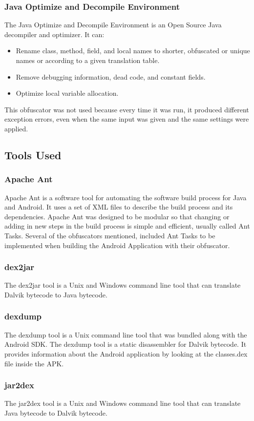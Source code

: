 \subsubsection{Java Optimize and Decompile Environment}
The Java Optimize and Decompile Environment \cite{jode} is an Open Source Java decompiler and optimizer. It can:
\begin{itemize}[leftmargin=*,labelindent=1cm]
\item Rename class, method, field, and local names to shorter, obfuscated or unique names or according to a given translation table.
\item Remove debugging information, dead code, and constant fields.
\item Optimize local variable allocation.
\end{itemize}
This obfuscator was not used because every time it was run, it produced different exception errors, even when the same input was given and the same settings were applied.
\subsection{Tools Used}
\subsubsection{Apache Ant}
Apache Ant \cite{apache} is a software tool for automating the software build process for Java and Android. It uses a set of XML files to describe the build process and its dependencies. Apache Ant was designed to be modular so that changing or adding in new steps in the build process is simple and efficient, usually called Ant Tasks. Several of the obfuscators mentioned, included Ant Tasks to be implemented when building the Android Application with their obfuscator.
\subsubsection{dex2jar}
The dex2jar tool \cite{dex2jar} is a Unix and Windows command line tool that can translate Dalvik bytecode to Java bytecode.
\subsubsection{dexdump}
The dexdump tool is a Unix command line tool that was bundled along with the Android SDK. The dexdump tool is a static disassembler for Dalvik bytecode. It provides information about the Android application by looking at the classes.dex file inside the APK.
\subsubsection{jar2dex}
The jar2dex tool \cite{dex2jar} is a Unix and Windows command line tool that can translate Java bytecode to Dalvik bytecode.
